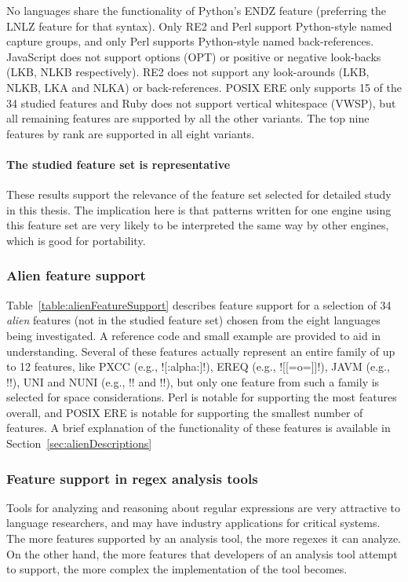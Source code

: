 No languages share the functionality of Python's ENDZ feature (preferring the LNLZ feature for that syntax).  Only RE2 and Perl support Python-style named capture groups, and only Perl supports Python-style named back-references.  JavaScript does not support options (OPT) or positive or negative look-backs (LKB, NLKB respectively).  RE2 does not support any look-arounds (LKB, NLKB, LKA and NLKA) or back-references.  POSIX ERE only supports 15 of the 34 studied features and Ruby does not support vertical whitespace (VWSP), but all remaining features are supported by all the other variants.  The top nine features by rank are supported in all eight variants.

\paragraph{The studied feature set is representative}  These results support the relevance of the feature set selected for detailed study in this thesis.  The implication here is that patterns written for one engine using this feature set are very likely to be interpreted the same way by other engines, which is good for portability.

\afterpage{\clearpage}



\subsubsection{Alien feature support}
Table~\ref{table:alienFeatureSupport} describes feature support for a selection of 34 \emph{alien} features (not in the studied feature set) chosen from the eight languages being investigated.  A reference code and small example are provided to aid in understanding.  Several of these features actually represent an entire family of up to 12 features, like PXCC (e.g., \cverb![:alpha:]!), EREQ (e.g., \cverb![[=o=]]!), JAVM (e.g., \cverb!!), UNI and NUNI (e.g., \cverb!\pL! and \cverb!\PM!), but only one feature from such a family is selected for space considerations.  Perl is notable for supporting the most features overall, and POSIX ERE is notable for supporting the smallest number of features.  A brief explanation of the functionality of these features is available in Section~\ref{sec:alienDescriptions}



\subsubsection{Feature support in regex analysis tools}
\label{sec:featuresInTools}
Tools for analyzing and reasoning about regular expressions are very attractive to language researchers, and may have industry applications for critical systems.  The more features supported by an analysis tool, the more regexes it can analyze.  On the other hand, the more features that developers of an analysis tool attempt to support, the more complex the implementation of the tool becomes.

